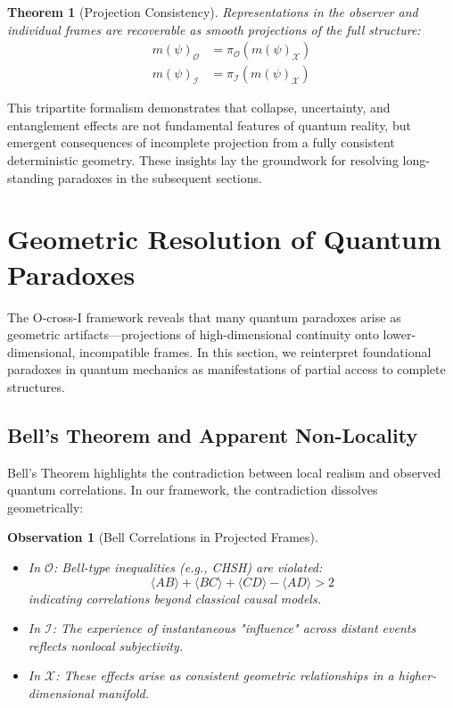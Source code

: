 \documentclass{article}
\newtheorem{theorem}{Theorem}
\newtheorem{observation}{Observation}
\begin{document}
\begin{theorem}[Projection Consistency]
Representations in the observer and individual frames are recoverable as smooth projections of the full structure:
\begin{align}
m(\psi)_{\mathcal{O}} &= \pi_{\mathcal{O}}(m(\psi)_{\mathcal{X}}) \\
m(\psi)_{\mathcal{I}} &= \pi_{\mathcal{I}}(m(\psi)_{\mathcal{X}})
\end{align}
\end{theorem}

This tripartite formalism demonstrates that collapse, uncertainty, and entanglement effects are not fundamental features of quantum reality, but emergent consequences of incomplete projection from a fully consistent deterministic geometry. These insights lay the groundwork for resolving long-standing paradoxes in the subsequent sections.




\section{Geometric Resolution of Quantum Paradoxes}

The O-cross-I framework reveals that many quantum paradoxes arise as geometric artifacts—projections of high-dimensional continuity onto lower-dimensional, incompatible frames. In this section, we reinterpret foundational paradoxes in quantum mechanics as manifestations of partial access to complete structures.

\subsection{Bell's Theorem and Apparent Non-Locality}

Bell's Theorem highlights the contradiction between local realism and observed quantum correlations. In our framework, the contradiction dissolves geometrically:

\begin{observation}[Bell Correlations in Projected Frames]\
\begin{itemize}
    \item In $\mathcal{O}$: Bell-type inequalities (e.g., CHSH) are violated:
    \begin{equation}
    \langle AB \rangle + \langle BC \rangle + \langle CD \rangle - \langle AD \rangle > 2
    \end{equation}
    indicating correlations beyond classical causal models.
    \item In $\mathcal{I}$: The experience of instantaneous "influence" across distant events reflects nonlocal subjectivity.
    \item In $\mathcal{X}$: These effects arise as consistent geometric relationships in a higher-dimensional manifold.
\end{itemize}
\end{observation}
\end{document}
